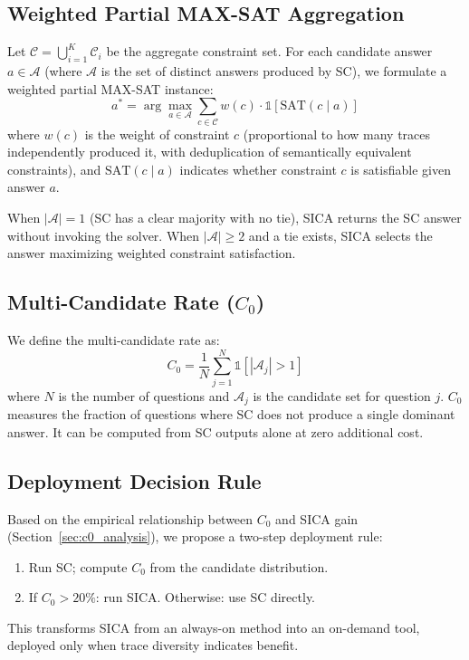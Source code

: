 \documentclass[11pt,a4paper]{article}
\begin{document}
\subsection{Weighted Partial MAX-SAT Aggregation}

Let $\mathcal{C} = \bigcup_{i=1}^{K} \mathcal{C}_i$ be the aggregate constraint set. For each candidate answer $a \in \mathcal{A}$ (where $\mathcal{A}$ is the set of distinct answers produced by SC), we formulate a weighted partial MAX-SAT instance:
\begin{equation}
a^* = \arg\max_{a \in \mathcal{A}} \sum_{c \in \mathcal{C}} w(c) \cdot \mathbb{1}[\text{SAT}(c \mid a)]
\end{equation}
where $w(c)$ is the weight of constraint $c$ (proportional to how many traces independently produced it, with deduplication of semantically equivalent constraints), and $\text{SAT}(c \mid a)$ indicates whether constraint $c$ is satisfiable given answer $a$.

When $|\mathcal{A}| = 1$ (SC has a clear majority with no tie), SICA returns the SC answer without invoking the solver. When $|\mathcal{A}| \geq 2$ and a tie exists, SICA selects the answer maximizing weighted constraint satisfaction.

\subsection{Multi-Candidate Rate ($C_0$)}

We define the multi-candidate rate as:
\begin{equation}
C_0 = \frac{1}{N} \sum_{j=1}^{N} \mathbb{1}[|\mathcal{A}_j| > 1]
\end{equation}
where $N$ is the number of questions and $\mathcal{A}_j$ is the candidate set for question $j$. $C_0$ measures the fraction of questions where SC does not produce a single dominant answer. It can be computed from SC outputs alone at zero additional cost.

\subsection{Deployment Decision Rule}

Based on the empirical relationship between $C_0$ and SICA gain (Section~\ref{sec:c0_analysis}), we propose a two-step deployment rule:
\begin{enumerate}
\item Run SC; compute $C_0$ from the candidate distribution.
\item If $C_0 > 20\%$: run SICA. Otherwise: use SC directly.
\end{enumerate}
This transforms SICA from an always-on method into an on-demand tool, deployed only when trace diversity indicates benefit.
\end{document}
